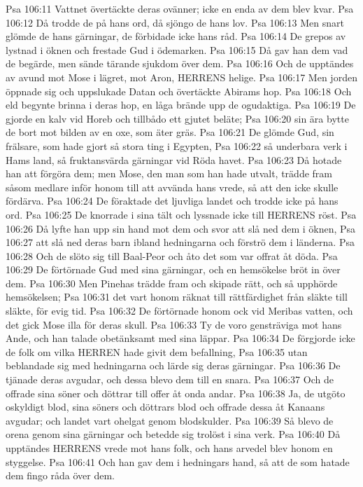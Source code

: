 Psa 106:11  Vattnet övertäckte deras ovänner; icke en enda av dem blev kvar.
Psa 106:12  Då trodde de på hans ord, då sjöngo de hans lov.
Psa 106:13  Men snart glömde de hans gärningar, de förbidade icke hans råd.
Psa 106:14  De grepos av lystnad i öknen och frestade Gud i ödemarken.
Psa 106:15  Då gav han dem vad de begärde, men sände tärande sjukdom över dem.
Psa 106:16  Och de upptändes av avund mot Mose i lägret, mot Aron, HERRENS helige.
Psa 106:17  Men jorden öppnade sig och uppslukade Datan och övertäckte Abirams hop.
Psa 106:18  Och eld begynte brinna i deras hop, en låga brände upp de ogudaktiga.
Psa 106:19  De gjorde en kalv vid Horeb och tillbådo ett gjutet beläte;
Psa 106:20  sin ära bytte de bort mot bilden av en oxe, som äter gräs.
Psa 106:21  De glömde Gud, sin frälsare, som hade gjort så stora ting i Egypten,
Psa 106:22  så underbara verk i Hams land, så fruktansvärda gärningar vid Röda havet.
Psa 106:23  Då hotade han att förgöra dem; men Mose, den man som han hade utvalt, trädde fram såsom medlare inför honom till att avvända hans vrede, så att den icke skulle fördärva.
Psa 106:24  De föraktade det ljuvliga landet och trodde icke på hans ord.
Psa 106:25  De knorrade i sina tält och lyssnade icke till HERRENS röst.
Psa 106:26  Då lyfte han upp sin hand mot dem och svor att slå ned dem i öknen,
Psa 106:27  att slå ned deras barn ibland hedningarna och förströ dem i länderna.
Psa 106:28  Och de slöto sig till Baal-Peor och åto det som var offrat åt döda.
Psa 106:29  De förtörnade Gud med sina gärningar, och en hemsökelse bröt in över dem.
Psa 106:30  Men Pinehas trädde fram och skipade rätt, och så upphörde hemsökelsen;
Psa 106:31  det vart honom räknat till rättfärdighet från släkte till släkte, för evig tid.
Psa 106:32  De förtörnade honom ock vid Meribas vatten, och det gick Mose illa för deras skull.
Psa 106:33  Ty de voro gensträviga mot hans Ande, och han talade obetänksamt med sina läppar.
Psa 106:34  De förgjorde icke de folk om vilka HERREN hade givit dem befallning,
Psa 106:35  utan beblandade sig med hedningarna och lärde sig deras gärningar.
Psa 106:36  De tjänade deras avgudar, och dessa blevo dem till en snara.
Psa 106:37  Och de offrade sina söner och döttrar till offer åt onda andar.
Psa 106:38  Ja, de utgöto oskyldigt blod, sina söners och döttrars blod och offrade dessa åt Kanaans avgudar; och landet vart ohelgat genom blodskulder.
Psa 106:39  Så blevo de orena genom sina gärningar och betedde sig trolöst i sina verk.
Psa 106:40  Då upptändes HERRENS vrede mot hans folk, och hans arvedel blev honom en styggelse.
Psa 106:41  Och han gav dem i hedningars hand, så att de som hatade dem fingo råda över dem.
